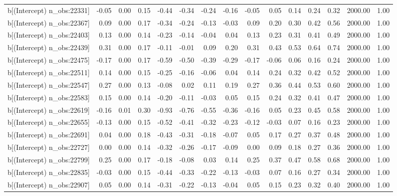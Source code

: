 \begin{table}[ht]
\begin{tabular}{rrrrrrrrrrrrrrr}
  b[(Intercept) n\_obs:22331] & -0.05 & 0.00 & 0.15 & -0.44 & -0.34 & -0.24 & -0.16 & -0.05 & 0.05 & 0.14 & 0.24 & 0.32 & 2000.00 & 1.00 \\ 
  b[(Intercept) n\_obs:22367] & 0.09 & 0.00 & 0.17 & -0.34 & -0.24 & -0.13 & -0.03 & 0.09 & 0.20 & 0.30 & 0.42 & 0.56 & 2000.00 & 1.00 \\ 
  b[(Intercept) n\_obs:22403] & 0.13 & 0.00 & 0.14 & -0.23 & -0.14 & -0.04 & 0.04 & 0.13 & 0.23 & 0.31 & 0.41 & 0.49 & 2000.00 & 1.00 \\ 
  b[(Intercept) n\_obs:22439] & 0.31 & 0.00 & 0.17 & -0.11 & -0.01 & 0.09 & 0.20 & 0.31 & 0.43 & 0.53 & 0.64 & 0.74 & 2000.00 & 1.00 \\ 
  b[(Intercept) n\_obs:22475] & -0.17 & 0.00 & 0.17 & -0.59 & -0.50 & -0.39 & -0.29 & -0.17 & -0.06 & 0.06 & 0.16 & 0.24 & 2000.00 & 1.00 \\ 
  b[(Intercept) n\_obs:22511] & 0.14 & 0.00 & 0.15 & -0.25 & -0.16 & -0.06 & 0.04 & 0.14 & 0.24 & 0.32 & 0.42 & 0.52 & 2000.00 & 1.00 \\ 
  b[(Intercept) n\_obs:22547] & 0.27 & 0.00 & 0.13 & -0.08 & 0.02 & 0.11 & 0.19 & 0.27 & 0.36 & 0.44 & 0.53 & 0.60 & 2000.00 & 1.00 \\ 
  b[(Intercept) n\_obs:22583] & 0.15 & 0.00 & 0.14 & -0.20 & -0.11 & -0.03 & 0.05 & 0.15 & 0.24 & 0.32 & 0.41 & 0.47 & 2000.00 & 1.00 \\ 
  b[(Intercept) n\_obs:22619] & -0.16 & 0.01 & 0.30 & -0.93 & -0.76 & -0.55 & -0.36 & -0.16 & 0.05 & 0.23 & 0.45 & 0.58 & 2000.00 & 1.00 \\ 
  b[(Intercept) n\_obs:22655] & -0.13 & 0.00 & 0.15 & -0.52 & -0.41 & -0.32 & -0.23 & -0.12 & -0.03 & 0.07 & 0.16 & 0.23 & 2000.00 & 1.00 \\ 
  b[(Intercept) n\_obs:22691] & 0.04 & 0.00 & 0.18 & -0.43 & -0.31 & -0.18 & -0.07 & 0.05 & 0.17 & 0.27 & 0.37 & 0.48 & 2000.00 & 1.00 \\ 
  b[(Intercept) n\_obs:22727] & 0.00 & 0.00 & 0.14 & -0.32 & -0.26 & -0.17 & -0.09 & 0.00 & 0.09 & 0.18 & 0.27 & 0.36 & 2000.00 & 1.00 \\ 
  b[(Intercept) n\_obs:22799] & 0.25 & 0.00 & 0.17 & -0.18 & -0.08 & 0.03 & 0.14 & 0.25 & 0.37 & 0.47 & 0.58 & 0.68 & 2000.00 & 1.00 \\ 
  b[(Intercept) n\_obs:22835] & -0.03 & 0.00 & 0.15 & -0.44 & -0.33 & -0.22 & -0.13 & -0.03 & 0.07 & 0.16 & 0.27 & 0.34 & 2000.00 & 1.00 \\ 
  b[(Intercept) n\_obs:22907] & 0.05 & 0.00 & 0.14 & -0.31 & -0.22 & -0.13 & -0.04 & 0.05 & 0.15 & 0.23 & 0.32 & 0.40 & 2000.00 & 1.00 \\ 

\end{tabular}
\end{table}
